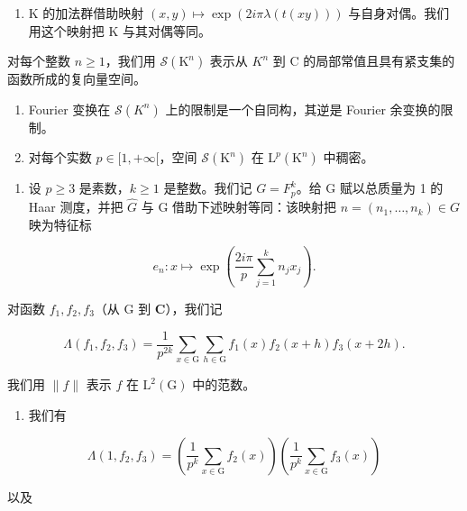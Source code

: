 \begin{enumerate}
\def\labelenumi{\alph{enumi})}
\tightlist
\item
  K 的加法群借助映射 \((x,y)\mapsto\exp(2i\pi\lambda(t(xy)))\) 与自身对偶。我们用这个映射把 K 与其对偶等同。
\end{enumerate}

对每个整数 \(n \geqslant 1\)，我们用 \(\mathcal{S}(\mathrm{K}^{n})\) 表示从 \(K^{n}\) 到 C 的局部常值且具有紧支集的函数所成的复向量空间。

\begin{enumerate}
\def\labelenumi{\alph{enumi})}
\setcounter{enumi}{1}
\item
  Fourier 变换在 \(\mathcal{S}(K^{n})\) 上的限制是一个自同构，其逆是 Fourier 余变换的限制。
\item
  对每个实数 \(p \in [1, +\infty[\)，空间 \(\mathcal{S}(\mathrm{K}^n)\) 在 \(\mathrm{L}^p (\mathrm{K}^n)\) 中稠密。
\end{enumerate}

\begin{enumerate}
\def\labelenumi{\arabic{enumi})}
\setcounter{enumi}{22}
\tightlist
\item
  设 \(p \geqslant 3\) 是素数，\(k \geqslant 1\) 是整数。我们记 \(G = F_{p}^{k}\)。给 G 赋以总质量为 1 的 Haar 测度，并把 \(\widehat{G}\) 与 G 借助下述映射等同：该映射把 \(n = (n_{1}, \ldots, n_{k}) \in G\) 映为特征标
\end{enumerate}

\[
e _ {n} \colon x \mapsto \exp \left(\frac {2 i \pi}{p} \sum_ {j = 1} ^ {k} n _ {j} x _ {j}\right).
\]

对函数 \(f_{1}, f_{2}, f_{3}\)（从 G 到 \(\mathbf{C}\)），我们记

\[
\Lambda (f _ {1}, f _ {2}, f _ {3}) = \frac {1}{p ^ {2 k}} \sum_ {x \in \mathrm{G}} \sum_ {h \in \mathrm{G}} f _ {1} (x) f _ {2} (x + h) f _ {3} (x + 2 h).
\]

我们用 \(\| f\|\) 表示 \(f\) 在 \(\mathrm{L}^2 (\mathrm{G})\) 中的范数。

\begin{enumerate}
\def\labelenumi{\alph{enumi})}
\tightlist
\item
我们有
\end{enumerate}

\[
\Lambda (1, f _ {2}, f _ {3}) = \left(\frac {1}{p ^ {k}} \sum_ {x \in \mathrm{G}} f _ {2} (x)\right) \left(\frac {1}{p ^ {k}} \sum_ {x \in \mathrm{G}} f _ {3} (x)\right)
\]

以及


